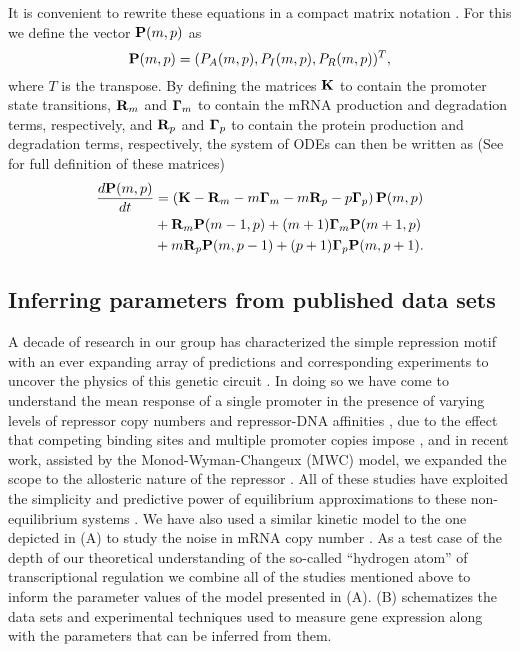 It is convenient to rewrite these equations in a compact matrix notation
\cite{Sanchez2013}. For this we define the vector $\mathbf{P}(m, p)$ as
\begin{equation}
  \mathbf{P}(m, p) = (P_A(m, p), P_I(m, p), P_R(m, p))^T,
\end{equation}
where $T$ is the transpose. By defining the matrices $\mathbf{K}$ to contain the
promoter state transitions, $\mathbf{R}_m$ and $\mathbf{\Gamma}_m$ to contain the mRNA production and
degradation terms, respectively, and $\mathbf{R}_p$ and $\mathbf{\Gamma}_p$ to contain the protein
production and degradation terms, respectively, the system of ODEs can then be
written as (See  for full definition of these matrices)
\begin{equation}
  \begin{aligned}
    {d{\mathbf{P}(m, p)} \over dt} &= \left( \mathbf{K} -\mathbf{R}_m -m\mathbf{\Gamma}_m -m\mathbf{R}_p -p\mathbf{\Gamma}_p \right) \mathbf{P}(m, p)\\
    &+ \mathbf{R}_m \mathbf{P}(m-1, p)
    + (m + 1) \mathbf{\Gamma}_m \mathbf{P}(m + 1, p)\\
    &+ m \mathbf{R}_p \mathbf{P}(m, p - 1)
    + (p + 1) \mathbf{\Gamma}_p \mathbf{P}(m, p + 1).
  \end{aligned}
  \label{eq_cme_matrix}
\end{equation}

\subsection{Inferring parameters from published data sets}
\label{sec_param}

A decade of research in our group has characterized the simple repression motif
with an ever expanding array of predictions and corresponding experiments to
uncover the physics of this genetic circuit \cite{Phillips2019}. In doing so
we have come to understand the mean response of a single promoter in the
presence of varying levels of repressor copy numbers and repressor-DNA
affinities \cite{Garcia2011c}, due to the effect that competing binding sites
and multiple promoter copies impose \cite{Brewster2014}, and in recent work,
assisted by the Monod-Wyman-Changeux (MWC) model, we expanded the scope to the
allosteric nature of the repressor \cite{Razo-Mejia2018}. All of these studies
have exploited the simplicity and predictive power of equilibrium approximations
to these non-equilibrium systems \cite{Buchler2003}. We have also used a similar
kinetic model to the one depicted in (A) to study the
noise in mRNA copy number \cite{Jones2014a}. As a test case of the depth of our
theoretical understanding of the so-called ``hydrogen atom'' of transcriptional
regulation we combine all of the studies mentioned above to inform the parameter
values of the model presented in (A).
(B) schematizes the data sets and experimental
techniques used to measure gene expression along with the parameters that can be
inferred from them.

